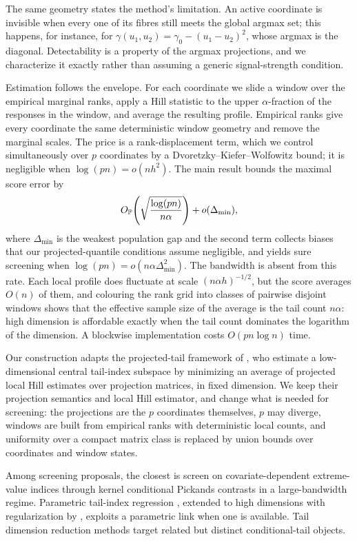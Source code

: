The same geometry states the method's limitation. An active coordinate is
invisible when every one of its fibres still meets the global argmax set;
this happens, for instance, for $\gamma(u_1,u_2)=\gamma_0-(u_1-u_2)^2$,
whose argmax is the diagonal. Detectability is a property of the argmax
projections, and we characterize it exactly rather than assuming a generic
signal-strength condition.

Estimation follows the envelope. For each coordinate we slide a window over
the empirical marginal ranks, apply a Hill statistic to the upper
$\alpha$-fraction of the responses in the window, and average the resulting
profile. Empirical ranks give every coordinate the same deterministic window
geometry and remove the marginal scales. The price is a rank-displacement
term, which we control simultaneously over $p$ coordinates by a
Dvoretzky--Kiefer--Wolfowitz bound; it is negligible when $\log(pn)=o(nh^2)$.
The main result bounds the maximal score error by
\[
 O_{\mathbb P}\!\left(\sqrt{\frac{\log(pn)}{n\alpha}}\right)+o(\Delta_{\min}),
\]
where $\Delta_{\min}$ is the weakest population gap and the second term
collects biases that our projected-quantile conditions assume
negligible, and yields sure screening when
$\log(pn)=o(n\alpha\Delta_{\min}^2)$. The bandwidth is absent from this
rate. Each local profile does fluctuate at scale $(n\alpha h)^{-1/2}$,
but the score averages $O(n)$ of them, and colouring the rank grid into
classes of pairwise disjoint windows shows that the effective sample size
of the average is the tail count $n\alpha$: high dimension is affordable
exactly when the tail count dominates the logarithm of the
dimension. A blockwise implementation costs $O(pn\log n)$ time.

Our construction adapts the projected-tail framework of
\citet{gardesPodgorny2025}, who estimate a low-dimensional central tail-index
subspace by minimizing an average of projected local Hill estimates over
projection matrices, in fixed dimension. We keep their projection semantics
and local Hill estimator, and change what is needed for screening: the
projections are the $p$ coordinates themselves, $p$ may diverge, windows are
built from empirical ranks with deterministic local counts, and uniformity
over a compact matrix class is replaced by union bounds over coordinates and
window states. 

Among screening
proposals, the closest is \citet{yoshidaUmezu2026} screen on covariate-dependent
extreme-value indices through kernel conditional Pickands contrasts in a
large-bandwidth regime. Parametric tail-index regression \citep{wangTsai2009}, extended to
high dimensions with regularization by \citet{sasakiTaoWang2026},
exploits a parametric link when one is available. Tail dimension reduction methods
\citep{gardes2018,aghbalouEtAl2024,bousebataEtAl2023,arbelEtAl2024} target
related but distinct conditional-tail objects. 

